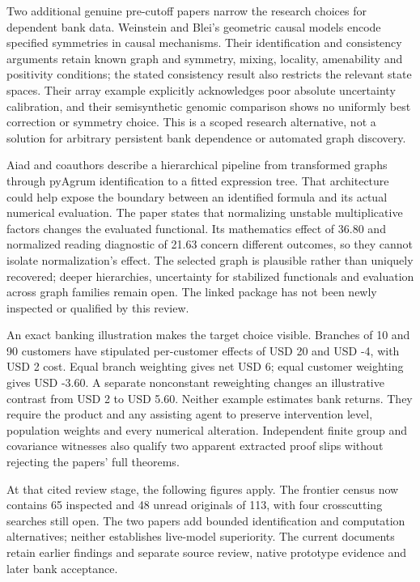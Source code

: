 Two additional genuine pre-cutoff papers narrow the research choices for
dependent bank data. Weinstein and Blei's geometric causal models encode
specified symmetries in causal mechanisms. Their identification and
consistency arguments retain known graph and symmetry, mixing, locality,
amenability and positivity conditions; the stated consistency result
also restricts the relevant state spaces. Their array example explicitly
acknowledges poor absolute uncertainty calibration, and their
semisynthetic genomic comparison shows no uniformly best correction or
symmetry choice. This is a scoped research alternative, not a solution
for arbitrary persistent bank dependence or automated graph discovery.
\citep{exec23_geometric_models}

Aiad and coauthors describe a hierarchical pipeline from transformed
graphs through pyAgrum identification to a fitted expression tree. That
architecture could help expose the boundary between an identified
formula and its actual numerical evaluation. The paper states that
normalizing unstable multiplicative factors changes the evaluated
functional. Its mathematics effect of 36.80 and normalized reading
diagnostic of 21.63 concern different outcomes, so they cannot isolate
normalization's effect. The selected graph is plausible rather than
uniquely recovered; deeper hierarchies, uncertainty for stabilized
functionals and evaluation across graph families remain open. The linked
package has not been newly inspected or qualified by this review.
\citep{exec23_hierarchical_pipeline}

An exact banking illustration makes the target choice visible. Branches
of 10 and 90 customers have stipulated per-customer effects of USD 20
and USD -4, with USD 2 cost. Equal branch weighting gives net USD 6;
equal customer weighting gives USD -3.60. A separate nonconstant
reweighting changes an illustrative contrast from USD 2 to USD 5.60.
Neither example estimates bank returns. They require the product and any
assisting agent to preserve intervention level, population weights and
every numerical alteration. Independent finite group and covariance
witnesses also qualify two apparent extracted proof slips without
rejecting the papers' full theorems. \citep{exec23_structured_reference}

At that cited review stage, the following figures apply. The frontier
census now contains 65 inspected and 48 unread originals of 113, with
four crosscutting searches still open. The two papers add bounded
identification and computation alternatives; neither establishes
live-model superiority. The current documents retain earlier findings
and separate source review, native prototype evidence and later bank
acceptance. \citep{sp23sc_reader,sp23sc_progress}

